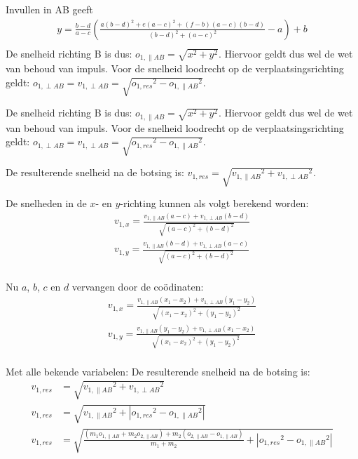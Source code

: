 \documentclass[12pt,a4paper]{article}
\begin{document}
	Invullen in AB geeft 
	\begin{equation}
		\begin{aligned}
		\label{y}
			y=\frac{b-d}{a-c}\left(\frac{a(b-d)^2+e(a-c)^2+(f-b)(a-c)(b-d)}{(b-d)^2+(a-c)^2}-a\right)+b\\
		\end{aligned}
	\end{equation}
	De snelheid richting B is dus: $o_{1, \parallel AB}=\sqrt{x^2+y^2}$. Hiervoor geldt dus wel de wet van behoud van impuls. Voor de snelheid loodrecht op de verplaatsingsrichting geldt: $o_{1, \perp AB}=v_{1, \perp AB}=\sqrt{{o_{1, res}}^2-{o_{1, \parallel AB}}^2}$.

	De snelheid richting B is dus: $o_{1, \parallel AB}=\sqrt{x^2+y^2}$. Hiervoor geldt dus wel de wet van behoud van impuls. Voor de snelheid loodrecht op de verplaatsingsrichting geldt: $o_{1, \perp AB}=v_{1, \perp AB}=\sqrt{{o_{1, res}}^2-{o_{1, \parallel AB}}^2}$.
	
	De resulterende snelheid na de botsing is: $v_{1, res}=\sqrt{{v_{1, \parallel AB}}^2+{v_{1, \perp AB}}^2}$.

	De snelheden in de $x$- en $y$-richting kunnen als volgt berekend worden:
	\begin{equation}
		\begin{aligned}
			v_{1, x}=\frac{v_{1, \parallel AB}\left(a-c\right)+v_{1, \perp AB}\left(b-d\right)}{\sqrt{\left(a-c\right)^2+\left(b-d\right)^2}}\\
			v_{1, y}=\frac{v_{1,  \parallel AB}\left(b-d\right)+v_{1, \perp AB}\left(a-c\right)}{\sqrt{\left(a-c\right)^2+\left(b-d\right)^2}}\\
		\end{aligned}
	\end{equation}

	Nu $a$, $b$, $c$ en $d$ vervangen door de co\"{o}dinaten:
	\begin{equation}
		\begin{aligned}
			v_{1, x}=\frac{v_{1,  \parallel AB}\left(x_1-x_2\right)+v_{1, \perp AB}\left(y_1-y_2\right)}{\sqrt{\left(x_1-x_2\right)^2+\left(y_1-y_2\right)^2}}\\
			v_{1, y}=\frac{v_{1,  \parallel AB}\left(y_1-y_2\right)+v_{1, \perp AB}\left(x_1-x_2\right)}{\sqrt{\left(x_1-x_2\right)^2+\left(y_1-y_2\right)^2}}\\
		\end{aligned}
	\end{equation}
	
	Met alle bekende variabelen:
	De resulterende snelheid na de botsing is: 
	\begin{equation}
		\begin{aligned}
			v_{1, res}&=\sqrt{{v_{1,  \parallel AB}}^2+{v_{1, \perp AB}}^2}\\
			v_{1, res}&=\sqrt{{v_{1,  \parallel AB}}^2+|{o_{1, res}}^2-{o_{1,  \parallel AB}}^2|}\\
			v_{1, res}&=\sqrt{\frac{\left(m_1o_{1,  \parallel AB}+m_2o_{2,  \parallel AB}\right)+m_2\left(o_{2,  \parallel AB}-o_{1,  \parallel AB}\right)}{m_1+m_2}+|{o_{1, res}}^2-{o_{1,  \parallel AB}}^2|}\\
		\end{aligned}
	\end{equation}
\end{document}
